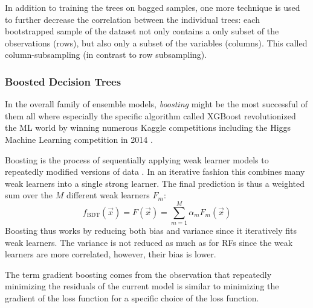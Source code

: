 In addition to training the trees on bagged samples, one more technique is used to further decrease the correlation between the individual trees: each bootstrapped sample of the dataset not only contains a only subset of the observations (rows), but also only a subset of the variables (columns). This called column-subsampling (in contrast to row subsampling).


\subsubsection{Boosted Decision Trees}
\label{subsubsec:ml:boosted_decision_trees}
In the overall family of ensemble models, \emph{boosting} might be the most successful of them all where especially the specific algorithm called XGBoost \autocite{chenXGBoostScalableTree2016} revolutionized the ML world by winning numerous Kaggle competitions \autocite{DmlcXgboost} including the Higgs Machine Learning competition in \num{2014} \autocite{HEPMeetsML}. 

Boosting is the process of sequentially applying weak learner models to repeatedly modified versions of data \autocite{hastieElementsStatisticalLearning2009}. In an iterative fashion this combines many weak learners into a single strong learner. The final prediction is thus a weighted sum over the $M$ different weak learners $F_m$: 
\begin{equation}
  f_\mathrm{BDT}(\vec{x}) = F(\vec{x}) = \sum_{m=1}^M \alpha_m F_m(\vec{x})
\end{equation}
Boosting thus works by reducing both bias and variance since it iteratively fits weak learners. The variance is not reduced as much as for RFs since the weak learners are more correlated, however, their bias is lower. 

The term gradient boosting comes from the observation that repeatedly minimizing the residuals of the current model is similar to minimizing the gradient of the loss function for a specific choice of the loss function.

